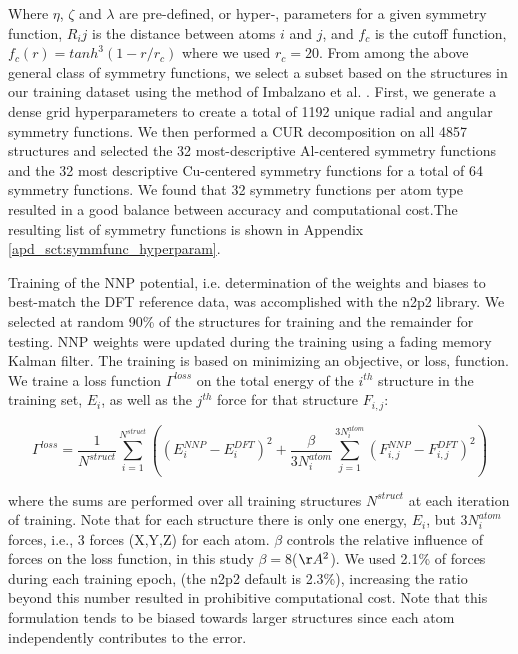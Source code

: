 \documentclass{article}
\begin{document}
Where $\eta$, $\zeta$ and $\lambda$ are pre-defined, or hyper-, parameters for a given symmetry function, $R_ij$ is the distance between atoms $i$ and $j$, and $f_c$ is the cutoff function, $f_c(r) = tanh^3(1-r/r_c)$ where we used $r_c=20$. 
From among the above general class of symmetry functions, we select a subset based on the structures in our training dataset using the method of Imbalzano et al. \cite{Imbalzano2018}.
First, we generate a dense grid hyperparameters to create a total of 1192 unique radial and angular symmetry functions.
We then performed a CUR decomposition on all 4857 structures and selected the 32 most-descriptive Al-centered symmetry functions and the 32 most descriptive Cu-centered symmetry functions for a total of 64 symmetry functions.
We found that 32 symmetry functions per atom type resulted in a good balance between accuracy and computational cost.The resulting list of symmetry functions is shown in Appendix \ref{apd_sct:symmfunc_hyperparam}.

Training of the NNP potential, i.e. determination of the weights and biases to best-match the DFT reference data, was accomplished with the n2p2 library\cite{Singraber2019ParallelPotentials}\cite{Singraber2019Library-BasedPotentials}.
We selected at random 90\% of the structures for training and the remainder for testing.
NNP weights were updated during the training using a fading memory Kalman filter.
The training is based on minimizing an objective, or loss, function.
We traine a loss function $\Gamma^{loss}$ on the total energy of the $i^{th}$ structure in the training set, $E_i$, as well as the $j^{th}$ force for that structure $F_{i,j}$:

\begin{equation}
\Gamma^{loss} = \frac{1}{N^{struct}} \sum^{N^{struct}}_{i=1}((E^{NNP}_i-E^{DFT}_i)^2+\frac{\beta}{3N^{atom}_i}\sum^{3N^{atom}_{i}}_{j=1}(F^{NNP}_{i,j}-F^{DFT}_{i,j})^2)
\end{equation}

where the sums are performed over all training structures $N^{struct}$ at each iteration of training.
Note that for each structure there is only one energy, $E_i$, but $3N^{atom}_i$ forces, i.e., 3 forces (X,Y,Z) for each atom.
$\beta$ controls the relative influence of forces on the loss function, in this study $\beta = 8$($\AA^2$).
We used 2.1\% of forces during each training epoch, (the n2p2 default is 2.3\%), increasing the ratio beyond this number resulted in prohibitive computational cost.
Note that this formulation tends to be biased towards larger structures since each atom independently contributes to the error. 
\end{document}
